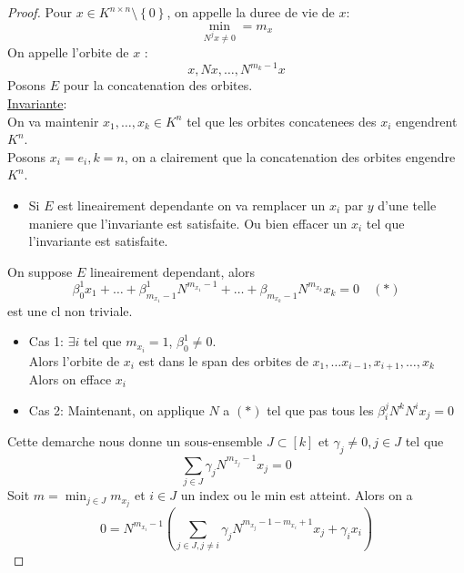 \documentclass[../main.tex]{subfiles}
\begin{document}
\begin{proof}
Pour $x \in K^{n\times n}\setminus \left\{ 0 \right\} $, on appelle la duree de vie de $x:$ 
\[ 
\min_{ N^{j}x\neq 0} = m_x
\]
On appelle l'orbite de $x$ :
\[ 
x, Nx, \ldots, N^{m_k-1}x
\]
Posons $E$ pour la concatenation des orbites.\\
\underline{Invariante}:\\
On va maintenir $x_1, \ldots, x_k \in K^{n}$ tel que les orbites concatenees des $x_i$ engendrent $K^{n}$.\\
Posons $x_i =e_i, k=n$, on a clairement que la concatenation des orbites engendre $K^{n}$.\\
\begin{itemize}
\item Si $E$ est lineairement dependante on va remplacer un $x_i$ par $y$ d'une telle maniere que l'invariante est satisfaite.
	Ou bien effacer un $x_i$ tel que l'invariante est satisfaite.
\end{itemize}
On suppose $E$ lineairement dependant, alors
\[ 
	\beta_0^{1}x_1 + \ldots + \beta_{m_{x_1} -1} ^{1}N^{m_{x_1} -1} + \ldots + \beta_{m_{x_k} -1} N^{m_{x_k} }x_k =0 \quad ( *) 
\]
est une cl non triviale.
\begin{itemize}
\item Cas 1: $\exists i $ tel que $m_{x_i} =1$, $\beta_0^{1}\neq 0$.\\
	Alors l'orbite de $x_i$ est dans le span des orbites de $x_1, \ldots x_{i-1} ,x_{i+1} , \ldots, x_k$\\
	Alors on efface $x_i$

\item Cas 2: Maintenant,  on applique  $N$ a  $( *) $ tel que pas tous les $\beta_i^{j}N^{k}N^{i}x_j=0$
\end{itemize}
Cette demarche nous donne un sous-ensemble $J \subset [ k] $ et $\gamma_j \neq 0, j \in J$ tel que
\[ 
\sum_{j \in J}^{ } \gamma_j N^{m_{x_j} -1}x_j=0
\]
Soit $m= \min_{j \in J} m_{x_j} $ et $i \in J$ un index ou le min est atteint.
Alors on a
\[ 
	0 = N^{m_{x_i} -1} \left( \sum_{j\in J, j\neq i}^{ } \gamma_j N^{m_{x_j} -1 - m_{x_i} + 1} x_j + \gamma_i x_i\right) 
\]

				

	
\end{proof}

	
\end{document}

